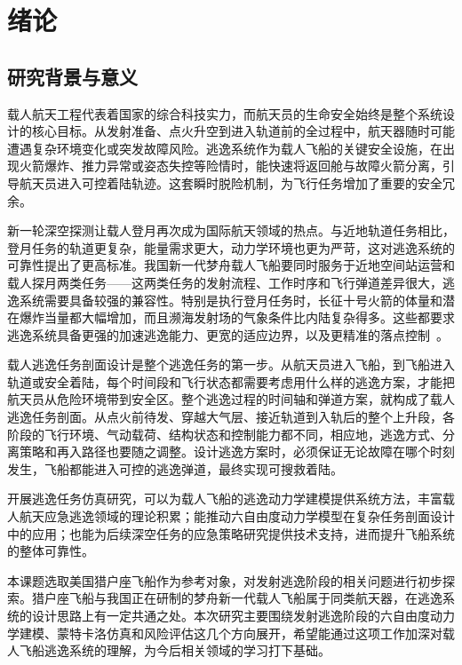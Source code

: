 
\chapter{绪论}

\section{研究背景与意义}

载人航天工程代表着国家的综合科技实力，而航天员的生命安全始终是整个系统设计的核心目标。从发射准备、点火升空到进入轨道前的全过程中，航天器随时可能遭遇复杂环境变化或突发故障风险。逃逸系统作为载人飞船的关键安全设施，在出现火箭爆炸、推力异常或姿态失控等险情时，能快速将返回舱与故障火箭分离，引导航天员进入可控着陆轨迹。这套瞬时脱险机制，为飞行任务增加了重要的安全冗余。

新一轮深空探测让载人登月再次成为国际航天领域的热点。与近地轨道任务相比，登月任务的轨道更复杂，能量需求更大，动力学环境也更为严苛，这对逃逸系统的可靠性提出了更高标准。我国新一代梦舟载人飞船要同时服务于近地空间站运营和载人探月两类任务——这两类任务的发射流程、工作时序和飞行弹道差异很大，逃逸系统需要具备较强的兼容性。特别是执行登月任务时，长征十号火箭的体量和潜在爆炸当量都大幅增加，而且濒海发射场的气象条件比内陆复杂得多。这些都要求逃逸系统具备更强的加速逃逸能力、更宽的适应边界，以及更精准的落点控制~\cite{田林2023}。

载人逃逸任务剖面设计是整个逃逸任务的第一步。从航天员进入飞船，到飞船进入轨道或安全着陆，每个时间段和飞行状态都需要考虑用什么样的逃逸方案，才能把航天员从危险环境带到安全区。整个逃逸过程的时间轴和弹道方案，就构成了载人逃逸任务剖面。从点火前待发、穿越大气层、接近轨道到入轨后的整个上升段，各阶段的飞行环境、气动载荷、结构状态和控制能力都不同，相应地，逃逸方式、分离策略和再入路径也要随之调整。设计逃逸方案时，必须保证无论故障在哪个时刻发生，飞船都能进入可控的逃逸弹道，最终实现可搜救着陆。

开展逃逸任务仿真研究，可以为载人飞船的逃逸动力学建模提供系统方法，丰富载人航天应急逃逸领域的理论积累；能推动六自由度动力学模型在复杂任务剖面设计中的应用；也能为后续深空任务的应急策略研究提供技术支持，进而提升飞船系统的整体可靠性。

本课题选取美国猎户座飞船作为参考对象，对发射逃逸阶段的相关问题进行初步探索。猎户座飞船与我国正在研制的梦舟新一代载人飞船属于同类航天器，在逃逸系统的设计思路上有一定共通之处。本次研究主要围绕发射逃逸阶段的六自由度动力学建模、蒙特卡洛仿真和风险评估这几个方向展开，希望能通过这项工作加深对载人飞船逃逸系统的理解，为今后相关领域的学习打下基础。

